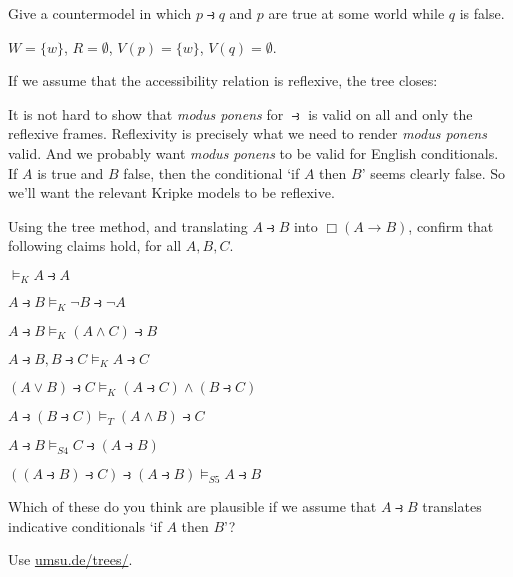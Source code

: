 \begin{exercise}
  Give a countermodel in which $p \strictif q$ and $p$ are true at some world
  while $q$ is false.
\end{exercise}
\begin{solution}
  $W = \{ w \}$, $R = \emptyset$, $V(p) = \{ w \} $, $V(q)=\emptyset$.
\end{solution}

If we assume that the accessibility relation is reflexive, the tree closes:
\begin{center}
\end{center}

It is not hard to show that \emph{modus ponens} for $\strictif$ is valid on all
and only the reflexive frames. Reflexivity is precisely what we need to render
\emph{modus ponens} valid. And we probably want \emph{modus ponens} to be valid
for English conditionals. If $A$ is true and $B$ false, then the conditional `if
$A$ then $B$' seems clearly false. So we'll want the relevant Kripke models to
be reflexive.

\begin{exercise}\label{ex:sda-import}
  Using the tree method, and translating $A \strictif B$ into $\Box(A \to B)$, confirm that following claims hold, for all $A,B,C$.
  \begin{exlist}
  \item $\models_K A \strictif A$
  \item $A \strictif B \models_K \neg B \strictif \neg A$
  \item $A \strictif B \models_K (A \land C) \strictif B$
  \item $A\strictif B, B \strictif C \models_{K} A \strictif C$
  \item $(A \lor B) \strictif C \models_K (A \strictif C) \land (B \strictif C)$
  \item $A \strictif (B \strictif C) \models_T (A \land B) \strictif C$
  \item $A\strictif B \models_{S4} C \strictif (A \strictif B)$
  \item $((A\strictif B) \strictif C) \strictif (A\strictif B) \models_{S5} A\strictif B$
  \end{exlist}
  \medskip

  Which of these do you think are plausible if we
  assume that $A \strictif B$ translates indicative conditionals `if $A$ then $B$'?
\end{exercise}
\begin{solution}
  Use \href{https://www.umsu.de/trees/}{umsu.de/trees/}.
\end{solution}

